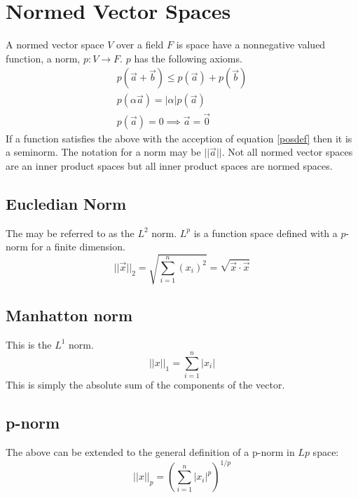\documentclass[a4paper]{article}
\newcommand{\norm}[1]{\lvert \lvert #1 \rvert \rvert}
\begin{document}
\section{Normed Vector Spaces}
A normed vector space $V$ over a field $F$ is space have a nonnegative valued function, a norm, $p:V \to F$. $p$ has the following axioms.
\begin{align}
  p(\vec{a}+\vec{b}) \le p(\vec{a})+p(\vec{b})\\
  p(\alpha \vec{a}) = \lvert \alpha \rvert p(\vec{a})\\
  p(\vec{a})=0 \implies \vec{a} = \vec{0}\label{posdef}
\end{align}
If a function satisfies the above with the acception of equation \ref{posdef} then it is a seminorm. The notation for a norm may be $\norm{\vec{a}}$. Not all normed vector spaces are an inner product spaces but all inner product spaces are normed spaces.
\subsection{Eucledian Norm}
The may be referred to as the $L^2$ norm. $L^p$ is a function space defined with a $p$-norm for a finite dimension.
\begin{equation}
  \norm{\vec{x}}_2 = \sqrt{\sum_{i=1}^n (x_i)^2} = \sqrt{\vec{x}\cdot \vec{x}}
\end{equation}
\subsection{Manhatton norm}
This is the $L^1$ norm.
\begin{equation}
  \norm{x}_1 = \sum_{i=1}^n \rvert x_i \lvert
\end{equation}
This is simply the absolute sum of the components of the vector.
\subsection{p-norm}
The above can be extended to the general definition of a p-norm in $Lp$ space:
\begin{equation}
  \norm{x}_p = \left( \sum_{i=1}^n \rvert x_i \lvert^p \right)^{1/p}
\end{equation}


\end{document}
